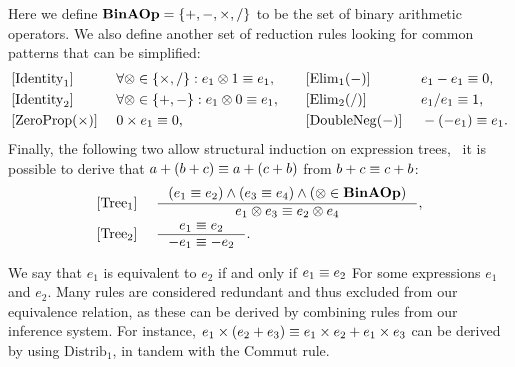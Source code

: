 Here we define $\mathbf{BinAOp} = \{ +, -, \times, / \}$ to be the set of binary
arithmetic operators.  We also define another set of reduction rules looking
for common patterns that can be simplified:
\begin{equation}
    \begin{aligned}{}
        & [\mathrm{Identity}_1] &~&
            \forall \otimes \in \{ \times, / \}:
            e_1 \otimes 1 \equiv e_1,
            & \quad
        & [\mathrm{Elim}_1 (-)] &~&
            e_1 - e_1 \equiv 0,
            \\
        & [\mathrm{Identity}_2] &~&
            \forall \otimes \in \{ +, - \}:
            e_1 \otimes 0 \equiv e_1,
            & \quad
        & [\mathrm{Elim}_2 (/)] &~&
            e_1 / e_1 \equiv 1,
            \\
        & [\mathrm{ZeroProp} (\times)] &~&
            0 \times e_1 \equiv 0,
            & \quad
        & [\mathrm{DoubleNeg} (-)] &~&
            -(-e_1) \equiv e_1.
            \\
    \end{aligned}
    \label{so:eq:common_reduction}
\end{equation}
Finally, the following two allow structural induction on expression trees,
\eg~it is possible to derive that $a + (b + c) \equiv a + (c + b)$ from $b + c
\equiv c + b$:
\begin{equation}
    \begin{aligned}
        & [\mathrm{Tree}_1] &~&
        \inference{%
            \left( e_1 \eqrel e_2 \right) \wedge
            \left( e_3 \eqrel e_4 \right) \wedge
            \left( \opsymbol \in \binaopset \right)
        }{%
            e_1 \opsymbol e_3 \eqrel e_2 \opsymbol e_4
        }, \\
        & [\mathrm{Tree}_2] &~&
        \inference{%
            e_1 \eqrel e_2
        }{%
            -e_1 \eqrel -e_2
        }.
    \end{aligned}
    \label{so:eq:equivalence_tree}
\end{equation}

We say that $e_1$ is equivalent to $e_2$ if and only if $e_1 \equiv e_2$ For
some expressions $e_1$ and $e_2$.  Many rules are considered redundant and thus
excluded from our equivalence relation, as these can be derived by combining
rules from our inference system.  For instance, $e_1 \times (e_2 + e_3) \equiv
e_1 \times e_2 + e_1 \times e_3$ can be derived by using $\mathrm{Distrib}_1$,
in tandem with the $\mathrm{Commut}$ rule.


